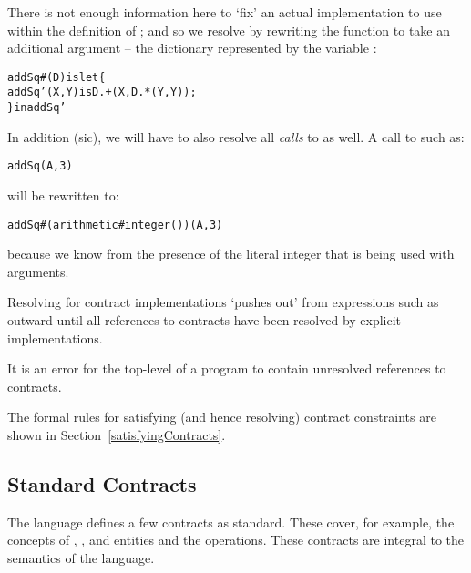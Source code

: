 There is not enough information here to `fix' an actual implementation to use within the definition of ; and so we resolve by rewriting the  function to take an additional argument -- the  dictionary represented by the variable :
\begin{alltt}
addSq\#(D) is let\{
  addSq'(X,Y) is D.+(X,D.*(Y,Y));
\} in addSq'
\end{alltt}
In addition (sic), we will have to also resolve all \emph{calls} to  as well. A call to  such as:
\begin{alltt}
addSq(A,3)
\end{alltt}
will be rewritten to:
\begin{alltt}
addSq\#(arithmetic\#integer())(A,3)
\end{alltt}
because we know from the presence of the literal integer that  is being used with  arguments.

Resolving for contract implementations `pushes out' from expressions such as  outward until all references to contracts have been resolved by explicit implementations.
\begin{aside}
It is an error for the top-level of a program to contain unresolved references to contracts.
\end{aside}

The formal rules for satisfying (and hence resolving) contract constraints are shown in Section~\vref{satisfyingContracts}.


\subsection{Standard Contracts}
\label{standardContracts}

The language defines a few contracts as standard. These cover, for example, the concepts of , , and  entities and the  operations. These contracts are integral to the semantics of the language.

